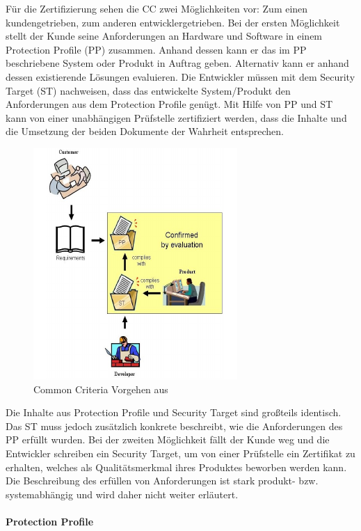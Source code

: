 \documentclass[11pt,a4paper]{report}
\begin{document}
Für die Zertifizierung sehen die CC zwei Möglichkeiten vor: Zum einen kundengetrieben, zum anderen entwicklergetrieben. Bei der ersten Möglichkeit stellt der Kunde seine Anforderungen an Hardware und Software in einem Protection Profile (PP) zusammen. Anhand dessen kann er das im PP beschriebene System oder Produkt in Auftrag geben. Alternativ kann er anhand dessen existierende Lösungen evaluieren. Die Entwickler müssen mit dem Security Target (ST) nachweisen, dass das entwickelte System/Produkt den Anforderungen aus dem Protection Profile genügt. Mit Hilfe von PP und ST kann von einer unabhängigen Prüfstelle zertifiziert werden, dass die Inhalte und die Umsetzung der beiden Dokumente der Wahrheit entsprechen.

\begin{figure}[htbp]
\centering
\includegraphics[scale=1.8]{images/cc_prozess.pdf}
\caption[]{Common Criteria Vorgehen aus \cite{bsi_ccguide}}
\label{fig:cc_prozess}
\end{figure}

Die Inhalte aus Protection Profile und Security Target sind großteils identisch. Das ST muss jedoch zusätzlich konkrete beschreibt, wie die Anforderungen des PP erfüllt wurden. Bei der zweiten Möglichkeit fällt der Kunde weg und die Entwickler schreiben ein Security Target, um von einer Prüfstelle ein Zertifikat zu erhalten, welches als Qualitätsmerkmal ihres Produktes beworben werden kann. Die Beschreibung des erfüllen von Anforderungen ist stark produkt- bzw. systemabhängig und wird daher nicht weiter erläutert.

\paragraph{Protection Profile}
\end{document}
